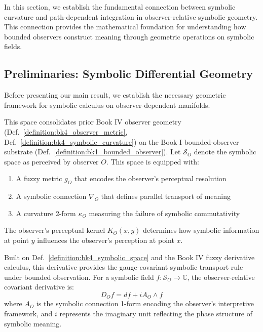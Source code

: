 In this section, we establish the fundamental connection between symbolic curvature and path-dependent integration in observer-relative symbolic geometry. This connection provides the mathematical foundation for understanding how bounded observers construct meaning through geometric operations on symbolic fields.

\subsection{Preliminaries: Symbolic Differential Geometry}
\label{subsec:bk4_preliminaries_symbolic_diff_geometry}

Before presenting our main result, we establish the necessary geometric framework for symbolic calculus on observer-dependent manifolds.

\begin{definition}
\label{definition:bk4_symbolic_space}
This space consolidates prior Book IV observer geometry (Def.~\ref{definition:bk4_observer_metric}, Def.~\ref{definition:bk4_symbolic_curvature}) on the Book I bounded-observer substrate (Def.~\ref{definition:bk1_bounded_observer}).
Let $\mathcal{S}_O$ denote the symbolic space as perceived by observer $O$. This space is equipped with:
\begin{enumerate}
    \item A fuzzy metric $g_O$ that encodes the observer's perceptual resolution
    \item A symbolic connection $\nabla_O$ that defines parallel transport of meaning
    \item A curvature 2-form $\kappa_O$ measuring the failure of symbolic commutativity
\end{enumerate}
The observer's perceptual kernel $K_O(x,y)$ determines how symbolic information at point $y$ influences the observer's perception at point $x$.
\end{definition}

\begin{definition}
\label{definition:bk4_symbolic_covariant}
Built on Def.~\ref{definition:bk4_symbolic_space} and the Book IV fuzzy derivative calculus, this derivative provides the gauge-covariant symbolic transport rule under bounded observation.
For a symbolic field $f: \mathcal{S}_O \to \mathbb{C}$, the observer-relative covariant derivative is:
\[
D_O f = df + i A_O \wedge f
\]
where $A_O$ is the symbolic connection 1-form encoding the observer's interpretive framework, and $i$ represents the imaginary unit reflecting the phase structure of symbolic meaning.
\end{definition}

